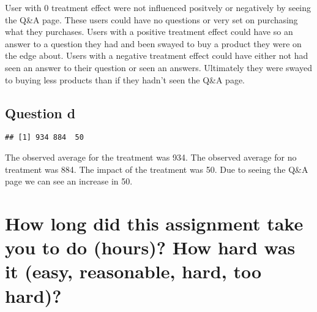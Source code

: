 \documentclass[
]{article}
\newenvironment{Shaded}{\begin{snugshade}}{\end{snugshade}}
\newcommand{\FunctionTok}[1]{\textcolor[rgb]{0.00,0.00,0.00}{#1}}
\newcommand{\NormalTok}[1]{#1}
\newcommand{\OtherTok}[1]{\textcolor[rgb]{0.56,0.35,0.01}{#1}}
\newcommand{\SpecialCharTok}[1]{\textcolor[rgb]{0.00,0.00,0.00}{#1}}
\begin{document}
User with 0 treatment effect were not influenced positvely or negatively
by seeing the Q\&A page. These users could have no questions or very set
on purchasing what they purchases. Users with a positive treatment
effect could have so an answer to a question they had and been swayed to
buy a product they were on the edge about. Users with a negative
treatment effect could have either not had seen an answer to their
question or seen an answers. Ultimately they were swayed to buying less
products than if they hadn't seen the Q\&A page.

\hypertarget{question-d}{%
\subsection{Question d}\label{question-d}}

\begin{Shaded}
\end{Shaded}

\begin{verbatim}
## [1] 934 884  50
\end{verbatim}

The observed average for the treatment was 934. The observed average for
no treatment was 884. The impact of the treatment was 50. Due to seeing
the Q\&A page we can see an increase in 50.

\hypertarget{how-long-did-this-assignment-take-you-to-do-hours-how-hard-was-it-easy-reasonable-hard-too-hard}{%
\section{How long did this assignment take you to do (hours)? How hard
was it (easy, reasonable, hard, too
hard)?}\label{how-long-did-this-assignment-take-you-to-do-hours-how-hard-was-it-easy-reasonable-hard-too-hard}}
\end{document}
